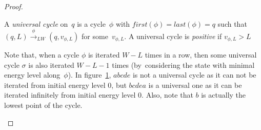 \begin{proof}
\vskip 0.7cm
\begin{definition}
A \emph{universal cycle} on~$q$ is a cycle~$\phi$ with
$first(\phi)=last(\phi)=q$ such that $(q,L)\xrightarrow{\phi}_{LW}(q,v_{\phi,L})$ for some~$v_{\phi,L}$. A universal cycle is \emph{positive} if $v_{\phi,L}>L$
\end{definition}

\vskip 0.4cm
Note that, when a cycle $\phi$ is iterated $W-L$ times in a row, then some universal cycle $\sigma$ is also iterated $W-L-1$ times (by~considering the state with minimal energy level along~$\phi$). 
In figure~\ref{unicycle}, $abcde$ is not a universal cycle as it can not be iterated from initial energy level 0, but $bcdea$ is a universal one as it can be iterated infinitely from initial energy level 0. Also, note that $b$ is actually the lowest point of the cycle.

\begin{figure}[htb]
    \centering
  
  \label{unicycle}
\end{figure}
    
    


\end{proof}
